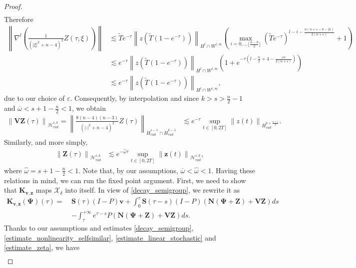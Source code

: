 \documentclass[10pt,a4paper]{amsart}
\newcommand{\HH}{\mathcal{H}}
\newcommand{\eps}{\varepsilon}
\newcommand{\norm}[1]{\left\|#1\right\|}
\begin{document}
\begin{proof}
\begin{align*}
		\end{align*}
		Therefore
		\begin{align*}
			\norm{ \nabla^l\left(\frac{1}{(\lvert\xi\rvert^2+n-4)^2}Z(\tau,\xi)\right)}&\lesssim \tilde{T} e^{-\tau}\norm{z(\tilde{T}(1-e^{-\tau}))}_{H^l\cap W^{l,\infty}}\left(\max_{i=0,\dots \lfloor{\frac{n-8}{2}}\rfloor }(\tilde{T} e^{-\tau})^{l-i-\frac{n(n+\eps-8-2i)}{2(n+\eps)}} +1\right)\\ & \lesssim e^{-\tau}\norm{z(\tilde{T}(1-e^{-\tau}))}_{H^l\cap W^{l,\infty}} \left(1+e^{-\tau(l-\frac{n}{2}+4-\frac{\eps n}{2(n+\eps)})}\right)\\ & \lesssim  e^{-\tau}\norm{z(\tilde{T}(1-e^{-\tau}))}_{H^l\cap W^{l,\infty}} ,
		\end{align*}
		due to our choice of $\eps$. Consequently, by interpolation and since $k>s>\frac{n}{2}-1$ and $\overline{\omega}<s+1-\frac{n}{2}<1$, we obtain
		\begin{align}\label{estimate_linear_stochastic}
			\norm{\mathbf{V}\mathbf{Z}(\tau)}_{\HH_{rad}^{s,k}}=\norm{\frac{8(n-4)(n-3)}{(\lvert \cdot\rvert^2+n-4)^2}Z(\tau)}_{\dot{H}^{s-1}_{rad}\cap \dot{H}^{k-1}_{rad}}&\lesssim e^{-\tau}\sup_{t\in [0,2T]}\norm{ z(t)}_{H^{k+\frac{n+1}{2}}_{rad}}.
		\end{align}
		Similarly, and more simply, 
		\begin{align}\label{estimate_zeta}
			\norm{\mathbf{Z}(\tau)}_{\HH_{rad}^{s,k}}&\lesssim e^{-\hat{\omega}\tau}\sup_{t\in [0,2T]}\norm{\mathbf{z}(t)}_{\HH_{rad}^{s,k}},
		\end{align}
		where $\hat{\omega}=s+1-\frac{n}{2}<1$. Note that, by our assumptions, $\overline{\omega}<\hat{\omega}<1$.
		Having these relations in mind, we can run the fixed point argument. First, we need to show that $\mathbf{K}_{\mathbf{v},\mathbf{z}}$ maps $\mathcal{X}_{\delta}$ into itself. In view of \eqref{decay_semigroup}, we rewrite it as
		\begin{align*}
			\mathbf{K}_{\mathbf{v},\mathbf{z}}(\mathbf{\Psi})(\tau)=\ &\mathbf{S}(\tau)(I-P)\mathbf{v}+\int_0^\tau \mathbf{S}(\tau-s)(I-P)\left(\mathbf{N}(\mathbf{\Psi}+\mathbf{Z})+\mathbf{V}\mathbf{Z} \right) ds  \\ & -\int_{\tau}^{+\infty} e^{\tau-s} P\left(\mathbf{N}(\mathbf{\Psi}+\mathbf{Z})+\mathbf{V}\mathbf{Z} \right) ds.
		\end{align*}
		Thanks to our assumptions and estimates  \eqref{decay_semigroup},  \eqref{estimate_nonlinearity_selfsimilar}, \eqref{estimate_linear_stochastic} and \eqref{estimate_zeta}, we have
		\begin{align*}

\end{align*}
\end{proof}
\end{document}

